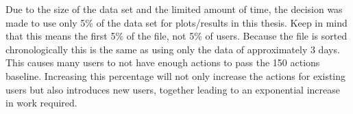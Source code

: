 \begin{table}[htbp]
	\centering
	\caption{The data set structure}\label{tab:data}
\end{table}

Due to the size of the data set and the limited amount of time, the decision was made to use only 5\% of the data set for plots/results in this thesis. Keep in mind that this means the first 5\% of the file, not 5\% of users. Because the file is sorted chronologically this is the same as using only the data of approximately 3 days. This causes many users to not have enough actions to pass the 150 actions baseline. Increasing this percentage will not only increase the actions for existing users but also introduces new users, together leading to an exponential increase in work required.

